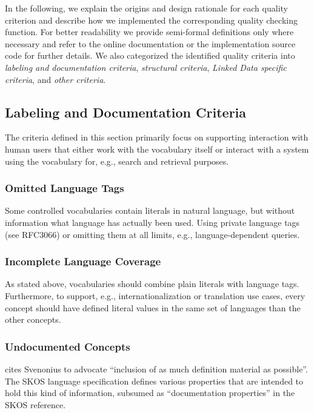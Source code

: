 
In the following, we explain the origins and design rationale for each quality criterion and describe how we implemented the corresponding quality checking function. For better readability we provide semi-formal definitions only where necessary and refer to the online documentation or the implementation source code for further details. We also categorized the identified quality criteria into \emph{labeling and documentation criteria}, \emph{structural criteria}, \emph{Linked Data specific criteria}, and \emph{other criteria}. 


\subsection{Labeling and Documentation Criteria}

The criteria defined in this section primarily focus on supporting interaction with human users that either work with the vocabulary itself or interact with a system using the vocabulary for, e.g., search and retrieval purposes.

\subsubsection{Omitted Language Tags}
Some controlled vocabularies contain literals in natural language, but without information what language has actually been used. Using private language tags (see RFC3066) or omitting them at all limits, e.g., language-dependent queries.

\subsubsection{Incomplete Language Coverage}
As stated above, vocabularies should combine plain literals with language tags. Furthermore, to support, e.g., internationalization or translation use cases, every concept should have defined literal values in the same set of languages than the other concepts.

\subsubsection{Undocumented Concepts}
\cite{Aitchison2000} cites Svenonius to advocate ``inclusion of as much definition material as possible''. The SKOS language specification defines various properties that are intended to hold this kind of information, subsumed as ``documentation properties'' in the SKOS reference.

